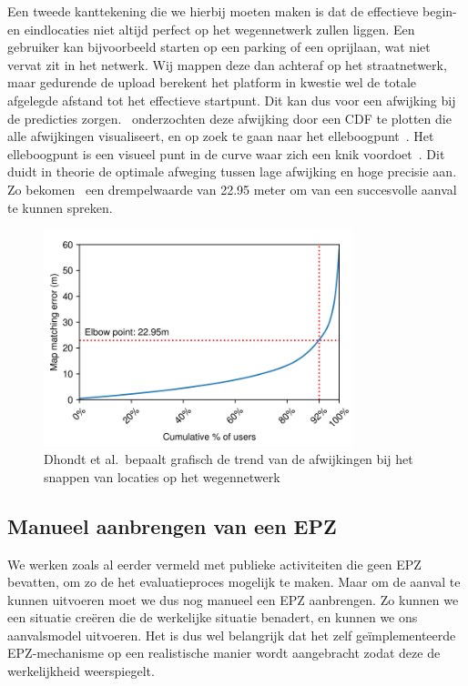 Een tweede kanttekening die we hierbij moeten maken is dat de effectieve begin-
en eindlocaties niet altijd perfect op het wegennetwerk zullen liggen. Een
gebruiker kan bijvoorbeeld starten op een parking of een oprijlaan, wat niet
vervat zit in het netwerk. Wij mappen deze dan achteraf op het straatnetwerk,
maar gedurende de upload berekent het platform in kwestie wel de totale
afgelegde afstand tot het effectieve startpunt. Dit kan dus voor een afwijking
bij de predicties zorgen.~\citeauthor{Dhondt} onderzochten deze afwijking door
een \ac{CDF} te plotten die alle afwijkingen visualiseert, en op zoek te gaan
naar het elleboogpunt~\cite{Dhondt}. Het elleboogpunt is een visueel punt in de
curve waar zich een knik voordoet~\cite{Introduc22:online}. Dit duidt in
theorie de optimale afweging tussen lage afwijking en hoge precisie aan. Zo
bekomen~\citeauthor{Dhondt} een drempelwaarde van 22.95 meter om van een
succesvolle aanval te kunnen spreken.
\begin{figure}[h]
    \centering
    \includegraphics[width=0.8\textwidth]{fig/Afwijkingen&Analyses/OvershootMappingDistance.png}
    \caption{Dhondt et al.\ bepaalt grafisch de trend van de afwijkingen bij het snappen van locaties op het wegennetwerk~\cite{Dhondt}}\label{fig:overshootMappingDistance}
\end{figure}

\subsection{Manueel aanbrengen van een EPZ}\label{sec:zelf_cloaking}
We werken zoals al eerder vermeld met publieke activiteiten die geen \ac{EPZ}
bevatten, om zo de het evaluatieproces mogelijk te maken. Maar om de aanval te
kunnen uitvoeren moet we dus nog manueel een \ac{EPZ} aanbrengen. Zo kunnen we
een situatie creëren die de werkelijke situatie benadert, en kunnen we ons
aanvalsmodel uitvoeren. Het is dus wel belangrijk dat het zelf geïmplementeerde
\ac{EPZ}-mechanisme op een realistische manier wordt aangebracht zodat deze de
werkelijkheid weerspiegelt.

